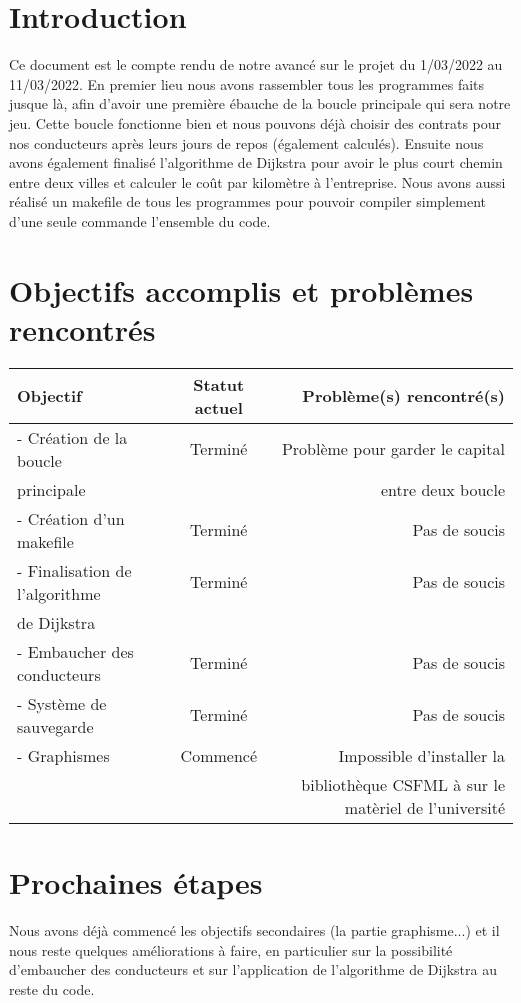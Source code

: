 \documentclass[a4paper, 12pt]{article}
\begin{document}
\newpage



\section*{Introduction}
      Ce document est le compte rendu de notre avancé sur le projet du 1/03/2022 au 11/03/2022. En premier lieu nous avons rassembler tous les programmes faits jusque là, afin d'avoir une première ébauche de la boucle principale qui sera notre jeu. Cette boucle fonctionne bien et nous pouvons déjà choisir des contrats pour nos conducteurs après leurs jours de repos (également calculés). Ensuite nous avons également finalisé l'algorithme de Dijkstra pour avoir le plus court chemin entre deux villes et calculer le coût par kilomètre à l'entreprise. Nous avons aussi réalisé un makefile de tous les programmes pour pouvoir compiler simplement d'une seule commande l'ensemble du code.

\section{Objectifs accomplis et problèmes rencontrés}
     \begin{tabular}{|l|c|r|}
  \hline
  Objectif & Statut actuel & Problème(s) rencontré(s) \\
  \hline
   - Création de la boucle & Terminé & Problème pour garder le capital\\
   principale && entre deux boucle \\
   - Création d'un makefile & Terminé & Pas de soucis\\
   - Finalisation de l'algorithme & Terminé & Pas de soucis\\
   de Dijkstra &&\\
   - Embaucher des conducteurs & Terminé & Pas de soucis \\
   - Système de sauvegarde & Terminé & Pas de soucis\\
   - Graphismes & Commencé & Impossible d'installer la\\
   &&bibliothèque CSFML à sur le matèriel de l'université\\
  

  \hline
\end{tabular}
\section{Prochaines étapes}
    Nous avons déjà commencé les objectifs secondaires (la partie graphisme...) et il nous reste quelques améliorations à faire, en particulier sur la possibilité d'embaucher des conducteurs et sur l'application de l'algorithme de Dijkstra au reste du code.
    
\end{document}
